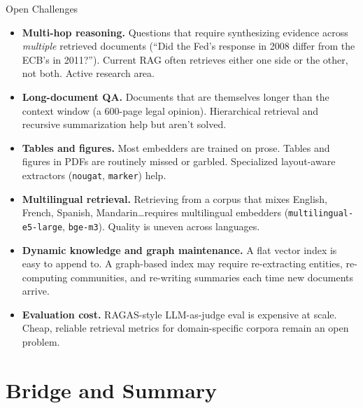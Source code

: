 \begin{frame}{Open Challenges}
\begin{itemize}
\item \textbf{Multi-hop reasoning.} Questions that require synthesizing evidence across \emph{multiple} retrieved documents (``Did the Fed's response in 2008 differ from the ECB's in 2011?''). Current RAG often retrieves either one side or the other, not both. Active research area.

\medskip
\item \textbf{Long-document QA.} Documents that are themselves longer than the context window (a 600-page legal opinion). Hierarchical retrieval and recursive summarization help but aren't solved.

\medskip
\item \textbf{Tables and figures.} Most embedders are trained on prose. Tables and figures in PDFs are routinely missed or garbled. Specialized layout-aware extractors (\texttt{nougat}, \texttt{marker}) help.

\medskip
\item \textbf{Multilingual retrieval.} Retrieving from a corpus that mixes English, French, Spanish, Mandarin\dots requires multilingual embedders (\texttt{multilingual-e5-large}, \texttt{bge-m3}). Quality is uneven across languages.

\medskip
\item \textbf{Dynamic knowledge and graph maintenance.} A flat vector index is easy to append to. A graph-based index may require re-extracting entities, re-computing communities, and re-writing summaries each time new documents arrive.

\medskip
\item \textbf{Evaluation cost.} RAGAS-style LLM-as-judge eval is expensive at scale. Cheap, reliable retrieval metrics for domain-specific corpora remain an open problem.
\end{itemize}
\end{frame}

\section{Bridge and Summary}

